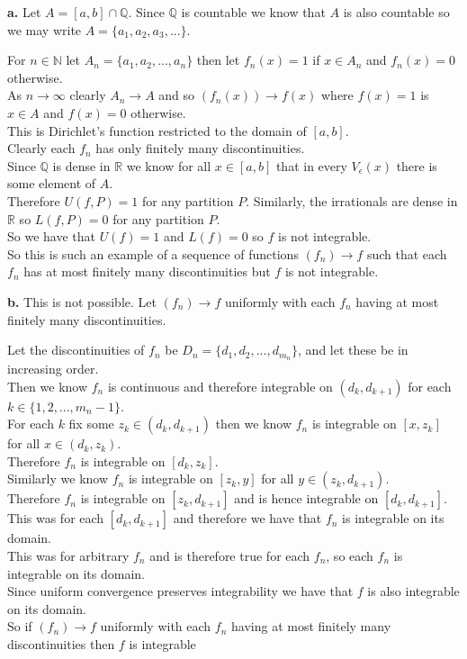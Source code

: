 \documentclass{article}
\begin{document}
{\Large\textbf{a.}} Let $A = [a, b]\cap\mathbb{Q}$. Since $\mathbb{Q}$ is countable we know that $A$ is also countable so we may write $A =\{a_1, a_2, a_3, ...\}$.
\begin{center}
    \doublespacing
    For $n\in\mathbb{N}$ let $A_n =\{a_1, a_2, ..., a_n\}$ then let $f_n (x) = 1$ if $x\in A_n$ and $f_n (x) = 0$ otherwise.
    \\As $n\rightarrow\infty$ clearly $A_n\rightarrow A$ and so $(f_n (x))\rightarrow f(x)$ where $f(x) = 1$ is $x\in A$ and $f(x) = 0$ otherwise.
    \\This is Dirichlet's function restricted to the domain of $[a, b]$.
    \\Clearly each $f_n$ has only finitely many discontinuities.
    \\Since $\mathbb{Q}$ is dense in $\mathbb{R}$ we know for all $x\in [a, b]$ that in every $V_{\epsilon} (x)$ there is some element of $A$.
    \\Therefore $U(f, P) = 1$ for any partition $P$. Similarly, the irrationals are dense in $\mathbb{R}$ so $L(f, P) = 0$ for any partition $P$.
    \\So we have that $U(f) = 1$ and $L(f) = 0$ so $f$ is not integrable.
    \\So this is such an example of a sequence of functions $(f_n)\rightarrow f$ such that each $f_n$ has at most finitely many discontinuities but $f$ is not integrable.
\end{center}

{\Large\textbf{b.}} This is not possible. Let $(f_n)\rightarrow f$ uniformly with each $f_n$ having at most finitely many discontinuities.
\begin{center}
    \doublespacing
    Let the discontinuities of $f_n$ be $D_n = \{d_{1}, d_{2}, ..., d_{m_n}\}$, and let these be in increasing order.
    \\Then we know $f_n$ is continuous and therefore integrable on $(d_k, d_{k+1})$ for each $k\in \{1, 2, ..., m_n - 1\}$.
    \\For each $k$ fix some $z_k\in (d_k, d_{k+1})$ then we know $f_n$ is integrable on $[x, z_k]$ for all $x\in (d_k, z_k)$.
    \\Therefore $f_n$ is integrable on $[d_k, z_k]$.
    \\Similarly we know $f_n$ is integrable on $[z_k, y]$ for all $y\in (z_k, d_{k+1})$.
    \\Therefore $f_n$ is integrable on $[z_k, d_{k+1}]$ and is hence integrable on $[d_k, d_{k+1}]$.
    \\This was for each $[d_k, d_{k+1}]$ and therefore we have that $f_n$ is integrable on its domain.
    \\This was for arbitrary $f_n$ and is therefore true for each $f_n$, so each $f_n$ is integrable on its domain.
    \\Since uniform convergence preserves integrability we have that $f$ is also integrable on its domain.
    \\So if $(f_n)\rightarrow f$ uniformly with each $f_n$ having at most finitely many discontinuities then $f$ is integrable \qedsymbol
\end{center}
\end{document}
